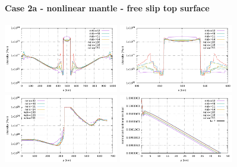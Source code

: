 \newpage
\paragraph{Case 2a - nonlinear mantle - free slip top surface} 

\begin{center}
\includegraphics[width=5cm]{python_codes/fieldstone_26/results/case2a/horizontal.pdf}
\includegraphics[width=5cm]{python_codes/fieldstone_26/results/case2a/horizontal_zoom.pdf}\\
\includegraphics[width=5cm]{python_codes/fieldstone_26/results/case2a/vertical.pdf}
\includegraphics[width=5cm]{python_codes/fieldstone_26/results/case2a/residual.pdf}
\end{center}

